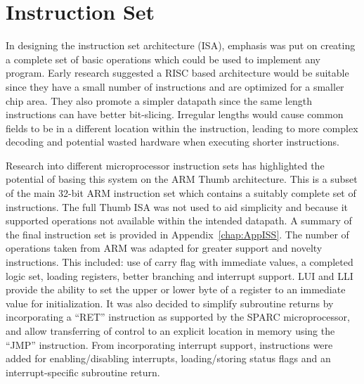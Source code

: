 
\chapter{Instruction Set}

In designing the instruction set architecture (ISA), emphasis was put on creating a complete set of basic operations which could be used to implement any program. 
Early research suggested a RISC based architecture would be suitable since they have a small number of instructions and are optimized for a smaller chip area. 
They also promote a simpler datapath since the same length instructions can have better bit-slicing. 
Irregular lengths would cause common fields to be in a different location within the instruction, leading to more complex decoding and potential wasted hardware when executing shorter instructions. 

Research into different microprocessor instruction sets has highlighted the potential of basing this system on the ARM Thumb architecture.
This is a subset of the main 32-bit ARM instruction set which contains a suitably complete set of instructions. 
The full Thumb ISA was not used to aid simplicity and because it supported operations not available within the intended datapath. 
A summary of the final instruction set is provided in Appendix~\ref{chap:AppISS}. 
The number of operations taken from ARM was adapted for greater support and novelty instructions.
This included: use of carry flag with immediate values, a completed logic set, loading registers, better branching and interrupt support. 
LUI and LLI provide the ability to set the upper or lower byte of a register to an immediate value for initialization. 
It was also decided to simplify subroutine returns by incorporating a ``RET'' instruction as supported by the SPARC microprocessor, and allow transferring of control to an explicit location in memory using the ``JMP'' instruction.
From incorporating interrupt support, instructions were added for enabling/disabling interrupts, loading/storing status flags and an interrupt-specific subroutine return.

